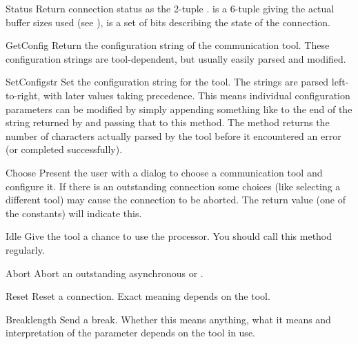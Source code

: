 \begin{methoddesc}[connection]{Status}{}
Return connection status as the 2-tuple .  is a 6-tuple giving the actual buffer sizes used
(see ),  is a set of bits describing the state
of the connection.
\end{methoddesc}

\begin{methoddesc}[connection]{GetConfig}{}
Return the configuration string of the communication tool. These
configuration strings are tool-dependent, but usually easily parsed
and modified.
\end{methoddesc}

\begin{methoddesc}[connection]{SetConfig}{str}
Set the configuration string for the tool. The strings are parsed
left-to-right, with later values taking precedence. This means
individual configuration parameters can be modified by simply appending
something like  to the end of the string returned by
 and passing that to this method. The method returns
the number of characters actually parsed by the tool before it
encountered an error (or completed successfully).
\end{methoddesc}

\begin{methoddesc}[connection]{Choose}{}
Present the user with a dialog to choose a communication tool and
configure it. If there is an outstanding connection some choices (like
selecting a different tool) may cause the connection to be
aborted. The return value (one of the  constants) will
indicate this.
\end{methoddesc}

\begin{methoddesc}[connection]{Idle}{}
Give the tool a chance to use the processor. You should call this
method regularly.
\end{methoddesc}

\begin{methoddesc}[connection]{Abort}{}
Abort an outstanding asynchronous  or .
\end{methoddesc}

\begin{methoddesc}[connection]{Reset}{}
Reset a connection. Exact meaning depends on the tool.
\end{methoddesc}

\begin{methoddesc}[connection]{Break}{length}
Send a break. Whether this means anything, what it means and
interpretation of the  parameter depends on the tool in
use.
\end{methoddesc}

